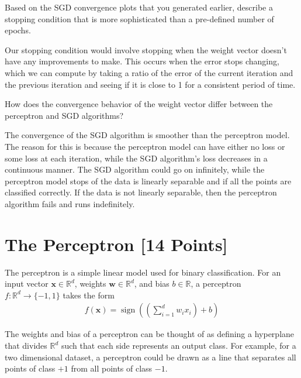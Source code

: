 \begin{problem}[2]
  Based on the SGD convergence plots that you generated earlier, describe a stopping condition that is more sophisticated than a pre-defined number of epochs.
\end{problem}
\begin{solution}
  Our stopping condition would involve stopping when the weight vector doesn't have any improvements to make. This occurs when the error stops changing, which we can compute by taking a ratio of the error of the current iteration and the previous iteration and seeing if it is close to 1 for a consistent period of time.
  
\end{solution}

\begin{problem}[2]
How does the convergence behavior of the weight vector differ between the perceptron and SGD algorithms?
\end{problem}
\begin{solution}
  The convergence of the SGD algorithm is smoother than the perceptron model. The reason for this is because the perceptron model can have either no loss or some loss at each iteration, while the SGD algorithm's loss decreases in a continuous manner. The SGD algorithm could go on infinitely, while the perceptron model stops of the data is linearly separable and if all the points are classified correctly. If the data is not linearly separable, then the perceptron algorithm fails and runs indefinitely.
\end{solution}





\newpage
\section{The Perceptron [14 Points]}

The perceptron is a simple linear model used for binary classification. For an input vector $\mathbf{x} \in \mathbb{R}^d$, weights $\mathbf{w} \in \mathbb{R}^d$, and bias $b \in \mathbb{R}$, a perceptron $f: \mathbb{R}^d \rightarrow \{-1,1\}$ takes the form
\begin{align*}
  f(\mathbf{x}) = \operatorname{sign}\left(\left(\sum_{i=1}^d w_i x_i\right) + b \right)
\end{align*}

The weights and bias of a perceptron can be thought of as defining a hyperplane that divides $\mathbb{R}^d$ such that each side represents an output class. For example, for a two dimensional dataset, a perceptron could be drawn as a line that separates all points of class $+1$ from all points of class $-1$.


